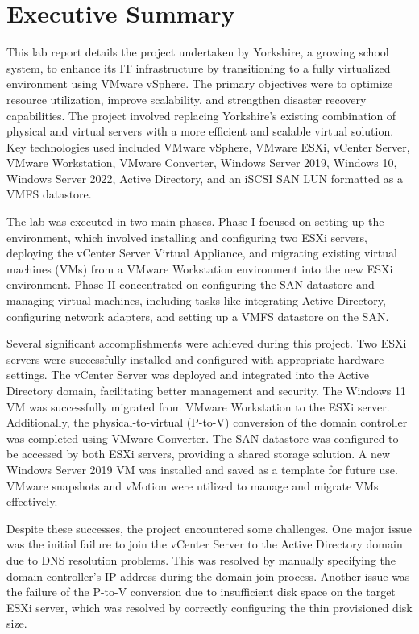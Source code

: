 \documentclass[letterpaper,12pt]{article}
\date{\today}
\title{}
\begin{document}
\tableofcontents

\newpage
\setcounter{tocdepth}{2}
\tableofcontents

\section{Executive Summary}
\label{sec:orgc89c46d}
This lab report details the project undertaken by Yorkshire, a growing school system, to enhance its IT infrastructure by transitioning to a fully virtualized environment using VMware vSphere. The primary objectives were to optimize resource utilization, improve scalability, and strengthen disaster recovery capabilities. The project involved replacing Yorkshire's existing combination of physical and virtual servers with a more efficient and scalable virtual solution. Key technologies used included VMware vSphere, VMware ESXi, vCenter Server, VMware Workstation, VMware Converter, Windows Server 2019, Windows 10, Windows Server 2022, Active Directory, and an iSCSI SAN LUN formatted as a VMFS datastore.

The lab was executed in two main phases. Phase I focused on setting up the environment, which involved installing and configuring two ESXi servers, deploying the vCenter Server Virtual Appliance, and migrating existing virtual machines (VMs) from a VMware Workstation environment into the new ESXi environment. Phase II concentrated on configuring the SAN datastore and managing virtual machines, including tasks like integrating Active Directory, configuring network adapters, and setting up a VMFS datastore on the SAN.

Several significant accomplishments were achieved during this project. Two ESXi servers were successfully installed and configured with appropriate hardware settings. The vCenter Server was deployed and integrated into the Active Directory domain, facilitating better management and security. The Windows 11 VM was successfully migrated from VMware Workstation to the ESXi server. Additionally, the physical-to-virtual (P-to-V) conversion of the domain controller was completed using VMware Converter. The SAN datastore was configured to be accessed by both ESXi servers, providing a shared storage solution. A new Windows Server 2019 VM was installed and saved as a template for future use. VMware snapshots and vMotion were utilized to manage and migrate VMs effectively.

Despite these successes, the project encountered some challenges. One major issue was the initial failure to join the vCenter Server to the Active Directory domain due to DNS resolution problems. This was resolved by manually specifying the domain controller's IP address during the domain join process. Another issue was the failure of the P-to-V conversion due to insufficient disk space on the target ESXi server, which was resolved by correctly configuring the thin provisioned disk size.
\end{document}
